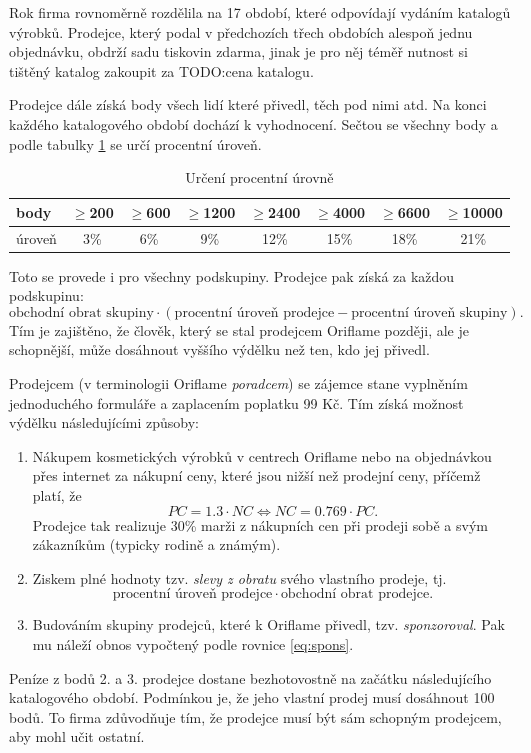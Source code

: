 \documentclass[a4wide,12pt]{report}
\begin{document}
Rok firma rovnoměrně rozdělila na 17 období, které odpovídají vydáním katalogů výrobků. Prodejce, který podal v předchozích třech obdobích alespoň jednu objednávku, obdrží sadu tiskovin zdarma, jinak je pro něj téměř nutnost si tištěný katalog zakoupit za TODO:cena katalogu.

Prodejce dále získá body všech lidí které přivedl, těch pod nimi atd. Na konci každého katalogového období dochází k vyhodnocení. Sečtou se všechny body a podle tabulky \ref{tab:perc_level} se určí procentní úroveň.
\begin{table}[htb]
\begin{center}
\begin{tabular}{|l|c|c|c|c|c|c|c|}
\hline
body & $\geq$200 & $\geq$600 & $\geq$1200 & $\geq$2400 & $\geq$4000 & $\geq$6600& $\geq$10000\\\hline
úroveň & 3\% & 6\% & 9\% & 12\% & 15\% & 18\% & 21\%\\\hline
\end{tabular}
\end{center}
\caption{Určení procentní úrovně}
\label{tab:perc_level}
\end{table}
Toto se provede i pro všechny podskupiny. Prodejce pak získá za každou podskupinu:
\begin{equation} \label{eq:spons}
\text{obchodní obrat skupiny} \cdot (\text{procentní úroveň prodejce} - \text{procentní úroveň skupiny}).
\end{equation}
Tím je zajištěno, že člověk, který se stal prodejcem Oriflame později, ale je schopnější, může dosáhnout vyššího výdělku než ten, kdo jej přivedl.

Prodejcem (v terminologii Oriflame \emph{poradcem}) se zájemce stane vyplněním jednoduchého formuláře a zaplacením poplatku 99 Kč. Tím získá možnost výdělku následujícími způsoby:
\begin{enumerate}
\item Nákupem kosmetických výrobků v centrech Oriflame nebo na objednávkou přes internet za nákupní ceny, které jsou nižší než prodejní ceny, příčemž platí, že
\begin{equation} \label{eq:pcnc}
PC=1.3 \cdot NC \Leftrightarrow NC = 0.769 \cdot PC.
\end{equation}
Prodejce tak realizuje 30\% marži z nákupních cen při prodeji sobě a svým zákazníkům (typicky rodině a známým).
\item Ziskem plné hodnoty tzv. \emph{slevy z obratu} svého vlastního prodeje, tj.
\begin{equation} \label{eq:so}
\text{procentní úroveň prodejce} \cdot \text{obchodní obrat prodejce}.
\end{equation}
\item Budováním skupiny prodejců, které k Oriflame přivedl, tzv. \emph{sponzoroval}. Pak mu náleží obnos vypočtený podle rovnice \ref{eq:spons}.
\end{enumerate}
Peníze z bodů 2. a 3. prodejce dostane bezhotovostně na začátku následujícího katalogového období. Podmínkou je, že jeho vlastní prodej musí dosáhnout 100 bodů. To firma zdůvodňuje tím, že prodejce musí být sám schopným prodejcem, aby mohl učit ostatní.
\end{document}
